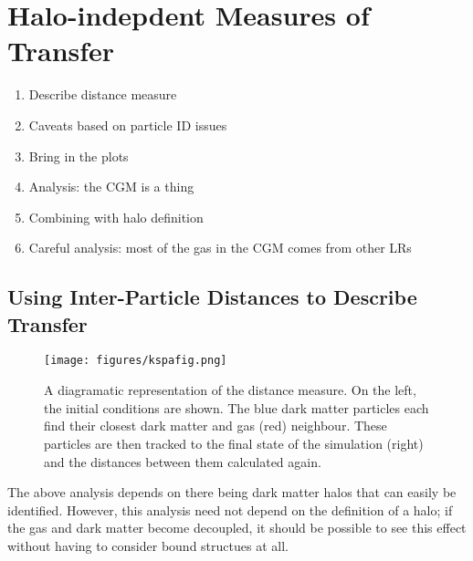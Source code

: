 \section{Halo-indepdent Measures of Transfer}

\begin{enumerate}
    \item Describe distance measure
    \item Caveats based on particle ID issues
    \item Bring in the plots
    \item Analysis: the CGM is a thing
    \item Combining with halo definition
    \item Careful analysis: most of the gas in the CGM comes from other LRs
\end{enumerate}

\subsection{Using Inter-Particle Distances to Describe Transfer}

\begin{figure*}
    \centering
    \texttt{[image: figures/kspafig.png]}
    \caption{A diagramatic representation of the distance measure. On the left, the initial conditions are shown. The blue dark matter particles each find their closest dark matter and gas (red) neighbour. These particles are then tracked to the final state of the simulation (right) and the distances between them calculated again. }
    \label{fig:distancemeasure}
\end{figure*}

The above analysis depends on there being dark matter halos that can easily be identified. However, this analysis need not depend on the definition of a halo; if the gas and dark matter become decoupled, it should be possible to see this effect without having to consider bound structues at all.

